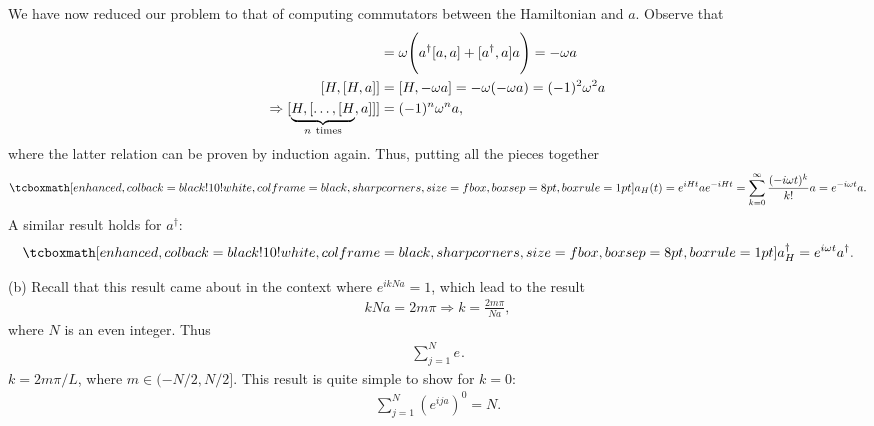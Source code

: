 {We have now reduced our problem to that of computing commutators between the Hamiltonian and $a$.
Observe that
\begin{align}
    [H,a] &= \omega \Bigg( a^{\dagger} [a,a] + [a^{\dagger},a] a \Bigg) = -\omega a \nonumber \\
    [H,[H,a]] &= [H,-\omega a] = -\omega (-\omega a) = (-1)^2 \omega^2 a \nonumber \\
    \Rightarrow [\underbrace{H,[\ldots,[H}_{n~{\rm times}},a]]] &= (-1)^{n} \omega^{n} a
,\end{align}
where the latter relation can be proven by induction again.
Thus, putting all the pieces together
\begin{align}
    \eqbox{ a_{H}(t) = e^{i H t} a e^{-i H t} = \sum_{k=0}^{\infty} \frac{(-i \omega t)^{k}}{k!} a = e^{-i \omega t} a }
.\end{align}
A similar result holds for $a^{\dagger}$:
\begin{align}
    \eqbox{ a_{H}^{\dagger} = e^{ i \omega t} a^{\dagger} }
.\end{align}


(b) Recall that this result came about in the context where $e^{ikNa} = 1$, which lead to the result
\begin{align}
    kNa = 2 m \pi \Rightarrow k = \frac{2 m \pi}{N a}
,\end{align}
where $N$ is an even integer.
Thus
\begin{align}
    \sum_{j=1}^{N} e^{}
.\end{align}
$k = 2 m \pi / L$, where $m \in ( -N/2,N/2 ]$.
This result is quite simple to show for $k = 0$:
\begin{align}
    \sum_{j=1}^{N} (e^{ija})^{0} = N
.\end{align}


}



